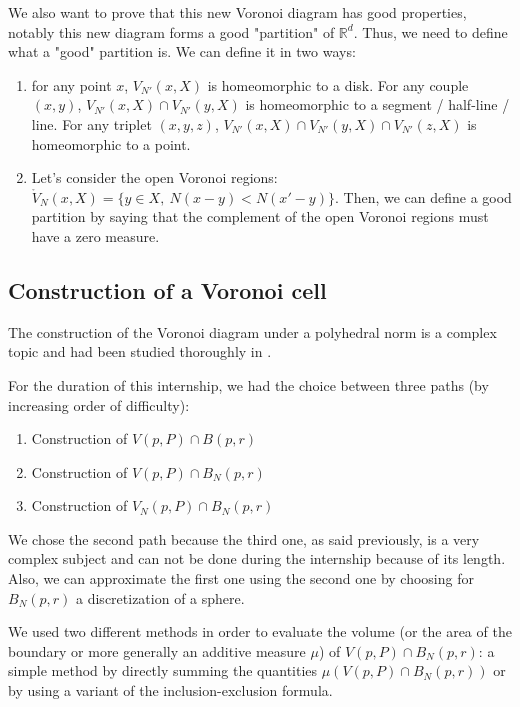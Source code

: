 We also want to prove that this new Voronoi diagram has good properties, notably
this new diagram forms a good "partition" of $ \mathbb{R}^d $. Thus, we need to
define what a "good" partition is.
We can define it in two ways:
\begin{enumerate}
    \item for any point $ x $, $ V_{N'}(x, X) $ is homeomorphic to a disk. For
        any couple $ (x, y) $, $ V_{N'}(x, X) \cap V_{N'}(y, X) $ is
        homeomorphic to a segment / half-line / line. For any triplet $ (x, y,
        z) $, $ V_{N'}(x, X) \cap V_{N'}(y, X) \cap V_{N'}(z, X) $ is
        homeomorphic to a point.
    \item Let's consider the open Voronoi regions: $ \ocirc{V}_N(x, X) = \{ y
        \in X,~ N(x - y) < N(x' - y)\} $. Then, we can define a good partition
        by saying that the complement of the open Voronoi regions must have a
        zero measure.
\end{enumerate}

\subsection{Construction of a Voronoi cell}

The construction of the Voronoi diagram under a polyhedral norm is a complex
topic and had been studied thoroughly in \cite{ma2000bisectors}.

For the duration of this internship, we had the choice between three paths
(by increasing order of difficulty):
\begin{enumerate}
    \item Construction of $ V(p, P) \cap B(p, r) $
    \item Construction of $ V(p, P) \cap B_N(p, r) $
    \item Construction of $ V_N(p, P) \cap B_N(p, r) $
\end{enumerate}

We chose the second path because the third one, as said previously, is a very
complex subject and can not be done during the internship because of its length.
Also, we can approximate the first one using the second one by choosing for $
B_N(p, r) $ a discretization of a sphere.

We used two different methods in order to evaluate the volume (or the area of
the boundary or more generally an additive measure $ \mu $) of $ V(p, P) \cap
B_N(p, r) $: a simple method by directly summing the quantities $ \mu(V(p, P)
\cap B_N(p, r)) $ or by using a variant of the inclusion-exclusion formula.

